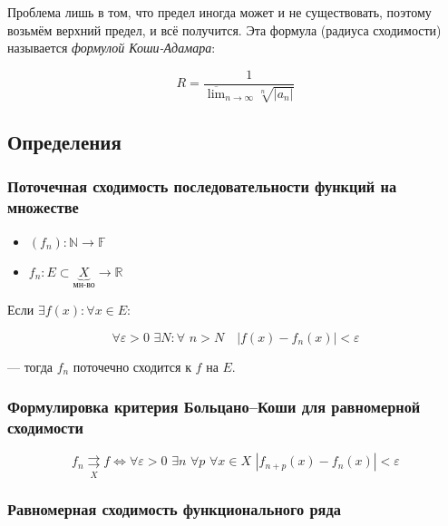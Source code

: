 \documentclass{article}
\def\dbl{\,\,}
\def\rsh#1{\underset{#1}{\rightrightarrows}}
\begin{document}
Проблема лишь в том, что предел иногда может и не существовать, поэтому возьмём верхний предел, и всё получится. Эта формула (радиуса сходимости) называется \textit{формулой Коши-Адамара}:

\[R = \frac{1}{ \overline{\lim}_{n \rightarrow \infty}\sqrt[n]{|a_n|}}\]

\newpage

\subsection{Определения}



\subsubsection{Поточечная сходимость последовательности функций на множестве}

\begin{itemize}
    \item $(f_n): \mathbb{N} \rightarrow \mathbb{F}$
    \item $f_n: E \subset \underbrace{X}_{\text{мн-во}} \rightarrow \mathbb{R}$
\end{itemize}

Если $\exists f(x): \forall x \in E$:

\[\forall \varepsilon > 0 \dbl \exists N: \forall \dbl n > N \quad |f(x) - f_n(x)| < \varepsilon\]

--- тогда $f_n$ поточечно сходится к $f$ на $E$.

\subsubsection{Формулировка критерия Больцано--Коши для равномерной сходимости}

\[f_n \rsh{X} f \Leftrightarrow \forall \varepsilon > 0 \dbl \exists n \dbl \forall p \dbl \forall x \in X \dbl \left|f_{n + p}(x) - f_n(x)\right| < \varepsilon \]

\subsubsection{Равномерная сходимость функционального ряда}
\end{document}

